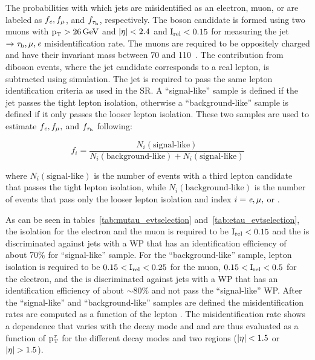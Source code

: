 The probabilities with which jets are misidentified as an electron, muon, or \tauh are labeled as $f_\textit{e}, f_\mu$, and $f_{\tau_{\text{h}}}$, respectively. The \PZ boson candidate is formed using two muons with $\text{p}_\text{T} > 26 \,\text{Ge\hspace{-.08em}V}$ and $\lvert\eta\rvert < 2.4$ and $\text{I}_\text{rel} < 0.15$ for measuring the jet $\to\tau_{\text{h}}, \mu, \textit{e}$ misidentification rate. The muons are required to be oppositely charged and have their invariant mass between 70 and 110~\GeV. The contribution from diboson events, where the jet candidate corresponds to a real lepton, is subtracted using simulation. The jet is required to pass the same lepton identification criteria as used in the SR. A ``signal-like'' sample is defined if the jet passes the tight lepton isolation, otherwise a ``background-like'' sample is defined if it only passes the looser lepton isolation. These two samples are used to estimate $f_\textit{e}, f_\mu,$ and $f_{\tau_{\text{h}}}$ following:
\begin{linenomath*}
  \begin{equation*}
    f_{i} = \frac{N_i(\text{signal-like})}{N_{i}(\text{background-like}) + N_i(\text{signal-like})}
  \end{equation*}
\end{linenomath*}
where $N_i(\text{signal-like})$ is the number of events with a third lepton candidate that passes the tight lepton isolation, while $N_i(\text{background-like})$ is the number of events that pass only the looser lepton isolation and index $i = \textit{e}, \mu,$ or \Pgt.

As can be seen in tables~\ref{tab:mutau_evtselection} and~\ref{tab:etau_evtselection}, the isolation for the electron and the muon is required to be $\text{I}_\text{rel} < 0.15$ and the \tauh is discriminated against jets with a WP that has an identification efficiency of about 70\% for ``signal-like'' sample. For the ``background-like'' sample, lepton isolation is required to be $0.15 < \text{I}_\text{rel} < 0.25$ for the muon, $0.15 < \text{I}_\text{rel} < 0.5$ for the electron, and the \tauh is discriminated against jets with a WP that has an identification efficiency of about $\sim 80\%$ and not pass the ``signal-like'' WP. After the ``signal-like'' and ``background-like'' samples are defined the misidentification rates are computed as a function of the lepton \pt. The \tauh misidentification rate shows a \pt dependence that varies with the \tauh decay mode and \aeta and are thus evaluated as a function of $\text{p}_\text{T}^{\tau}$ for the different decay modes and two \aeta regions ($\lvert\eta\rvert < 1.5$ or $\lvert\eta\rvert > 1.5$).

